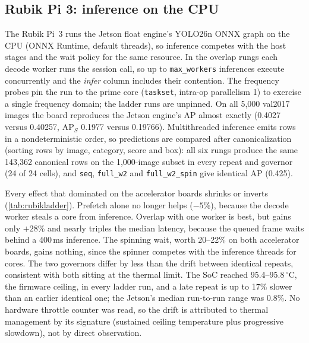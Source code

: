\subsection{Rubik Pi 3: inference on the CPU}
\label{sec:rubik}

The Rubik Pi~3 runs the Jetson float engine's YOLO26n ONNX graph on
the CPU (ONNX Runtime, default threads), so inference competes with
the host stages and the wait policy for the same resource. In the
overlap rungs each decode worker runs the session call, so up to
\texttt{max\_workers} inferences execute concurrently and the
\emph{infer} column includes their contention. The frequency probes
pin the run to the prime core (\texttt{taskset}, intra-op parallelism
1) to exercise a single frequency domain; the ladder runs are
unpinned. On all 5,000 val2017 images the board reproduces the Jetson
engine's AP almost exactly (0.4027 versus 0.40257, AP$_S$ 0.1977
versus 0.19766). Multithreaded inference emits rows in a
nondeterministic order, so predictions are compared after
canonicalization (sorting rows by image, category, score and box): all
six rungs produce the same 143,362 canonical rows on the 1,000-image
subset in every repeat and governor (24 of 24 cells), and
\texttt{seq}, \texttt{full\_w2} and \texttt{full\_w2\_spin} give
identical AP (0.425).

Every effect that dominated on the accelerator boards shrinks or
inverts (\cref{tab:rubikladder}). Prefetch alone no longer helps
($-5$\%), because the decode worker steals a core from inference.
Overlap with one worker is best, but gains only $+28$\% and nearly
triples the median latency, because the
queued frame waits behind a 400\,ms inference. The spinning wait,
worth 20--22\% on both accelerator boards, gains nothing, since the
spinner competes with the inference threads for cores. The two
governors differ by less than the drift between identical repeats,
consistent with both sitting at the thermal limit. The SoC reached
95.4--95.8\,$^\circ$C, the firmware ceiling, in every ladder run, and
a late repeat is up to 17\% slower than an earlier identical one; the
Jetson's median run-to-run range was 0.8\%. No hardware throttle
counter was read, so the drift is attributed to thermal management by
its signature (sustained ceiling temperature plus progressive
slowdown), not by direct observation.


